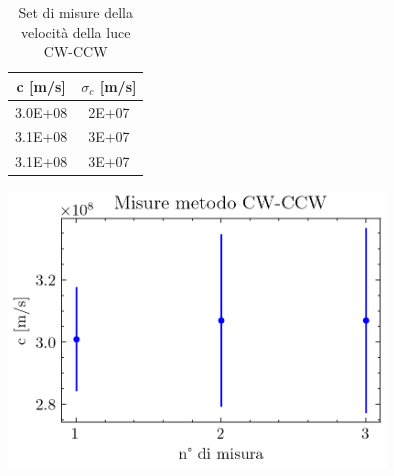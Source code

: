 \documentclass{article}
\begin{document}
            \begin{table}[H]
                
                \centering
                \begin{minipage}{0.35\linewidth}

                    \centering
                    \begin{tabular}{ c c }
                        
                        \toprule
                        c [m/s] &  $\sigma_c$ [m/s] \\
                        
                        \midrule
                        3.0E+08 & 2E+07  \\
                        3.1E+08 & 3E+07  \\ 
                        3.1E+08 & 3E+07  \\
                        \bottomrule 

                    \end{tabular}

                    \caption{Set di misure della velocità della luce CW-CCW}

                \end{minipage}
                \begin{minipage}{0.6\linewidth}

                    \centering
                    \includegraphics[width=10cm]{../images/CW_CCW.png}


                \end{minipage}

            \end{table}
\end{document}

